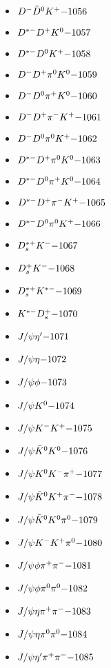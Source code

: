 \begin{multicols}{3}
\begin{itemize}
 \item $ D^{-} \bar{D}^{0} K^{+} \hfill{-1056}$
 \item $ D^{*-} D^{+} K^{0} \hfill{-1057}$
 \item $ D^{*-} D^{0} K^{+} \hfill{-1058}$
 \item $ D^{-} D^{+} \pi^{0} K^{0} \hfill{-1059}$
 \item $ D^{-} D^{0} \pi^{+} K^{0} \hfill{-1060}$
 \item $ D^{-} D^{+} \pi^{-} K^{+} \hfill{-1061}$
 \item $ D^{-} D^{0} \pi^{0} K^{+} \hfill{-1062}$
 \item $ D^{*-} D^{+} \pi^{0} K^{0} \hfill{-1063}$
 \item $ D^{*-} D^{0} \pi^{+} K^{0} \hfill{-1064}$
 \item $ D^{*-} D^{+} \pi^{-} K^{+} \hfill{-1065}$
 \item $ D^{*-} D^{0} \pi^{0} K^{+} \hfill{-1066}$
 \item $ D_{s}^{*+} K^{-} \hfill{-1067}$
 \item $ D_{s}^{+} K^{-} \hfill{-1068}$
 \item $ D_{s}^{*+} K^{*-} \hfill{-1069}$
 \item $ K^{*-} D_{s}^{+} \hfill{-1070}$
 \item $ J/\psi {\eta^{\prime}} \hfill{-1071}$
 \item $ J/\psi \eta \hfill{-1072}$
 \item $ J/\psi \phi \hfill{-1073}$
 \item $ J/\psi K^{0} \hfill{-1074}$
 \item $ J/\psi K^{-} K^{+} \hfill{-1075}$
 \item $ J/\psi \bar{K}^{0} K^{0} \hfill{-1076}$
 \item $ J/\psi K^{0} K^{-} \pi^{+} \hfill{-1077}$
 \item $ J/\psi \bar{K}^{0} K^{+} \pi^{-} \hfill{-1078}$
 \item $ J/\psi \bar{K}^{0} K^{0} \pi^{0} \hfill{-1079}$
 \item $ J/\psi K^{-} K^{+} \pi^{0} \hfill{-1080}$
 \item $ J/\psi \phi \pi^{+} \pi^{-} \hfill{-1081}$
 \item $ J/\psi \phi \pi^{0} \pi^{0} \hfill{-1082}$
 \item $ J/\psi \eta \pi^{+} \pi^{-} \hfill{-1083}$
 \item $ J/\psi \eta \pi^{0} \pi^{0} \hfill{-1084}$
 \item $ J/\psi {\eta^{\prime}} \pi^{+} \pi^{-} \hfill{-1085}$

\end{itemize}
\end{multicols}
